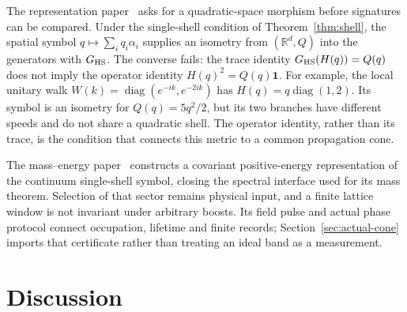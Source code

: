 \documentclass[12pt]{article}
\theoremstyle{definition}
\theoremstyle{remark}
\begin{document}
The representation paper~\cite{Liu2026QRAIF_C} asks for a quadratic-space morphism before signatures can be compared. Under the single-shell condition of Theorem~\ref{thm:shell}, the spatial symbol $q\mapsto\sum_iq_i\alpha_i$ supplies an isometry from $(\mathbb R^d,Q)$ into the generators with $G_{\rm HS}$. The converse fails: the trace identity $G_{\rm HS}(H(q))=Q(q)$ does not imply the operator identity $H(q)^2=Q(q)\mathbf 1$. For example, the local unitary walk $W(k)=\operatorname{diag}(e^{-ik},e^{-2ik})$ has $H(q)=q\operatorname{diag}(1,2)$. Its symbol is an isometry for $Q(q)=5q^2/2$, but its two branches have different speeds and do not share a quadratic shell. The operator identity, rather than its trace, is the condition that connects this metric to a common propagation cone.

The mass--energy paper~\cite{Liu2026QRAIF_ME} constructs a covariant positive-energy representation of the continuum single-shell symbol, closing the spectral interface used for its mass theorem. Selection of that sector remains physical input, and a finite lattice window is not invariant under arbitrary boosts. Its field pulse and actual phase protocol connect occupation, lifetime and finite records; Section~\ref{sec:actual-cone} imports that certificate rather than treating an ideal band as a measurement.

\section{Discussion}
\label{sec:discussion}
\end{document}
